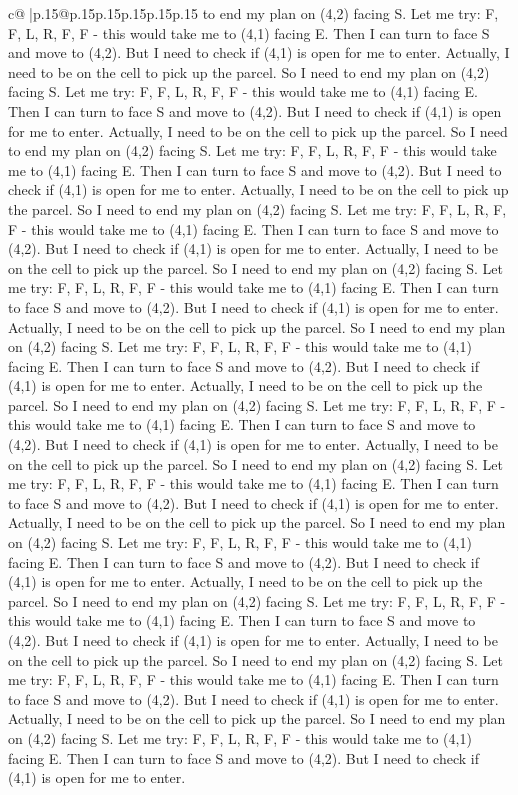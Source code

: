 \documentclass{article}
\begin{document}
{\begin{supertabular}{c@{$\;$}|p{.15\linewidth}@{}p{.15\linewidth}p{.15\linewidth}p{.15\linewidth}p{.15\linewidth}p{.15\linewidth}}
{{{to end my plan on (4,2) facing S. Let me try: F, F, L, R, F, F {-} this would take me to (4,1) facing E. Then I can turn to face S and move to (4,2). But I need to check if (4,1) is open for me to enter. Actually, I need to be on the cell to pick up the parcel. So I need to end my plan on (4,2) facing S. Let me try: F, F, L, R, F, F {-} this would take me to (4,1) facing E. Then I can turn to face S and move to (4,2). But I need to check if (4,1) is open for me to enter. Actually, I need to be on the cell to pick up the parcel. So I need to end my plan on (4,2) facing S. Let me try: F, F, L, R, F, F {-} this would take me to (4,1) facing E. Then I can turn to face S and move to (4,2). But I need to check if (4,1) is open for me to enter. Actually, I need to be on the cell to pick up the parcel. So I need to end my plan on (4,2) facing S. Let me try: F, F, L, R, F, F {-} this would take me to (4,1) facing E. Then I can turn to face S and move to (4,2). But I need to check if (4,1) is open for me to enter. Actually, I need to be on the cell to pick up the parcel. So I need to end my plan on (4,2) facing S. Let me try: F, F, L, R, F, F {-} this would take me to (4,1) facing E. Then I can turn to face S and move to (4,2). But I need to check if (4,1) is open for me to enter. Actually, I need to be on the cell to pick up the parcel. So I need to end my plan on (4,2) facing S. Let me try: F, F, L, R, F, F {-} this would take me to (4,1) facing E. Then I can turn to face S and move to (4,2). But I need to check if (4,1) is open for me to enter. Actually, I need to be on the cell to pick up the parcel. So I need to end my plan on (4,2) facing S. Let me try: F, F, L, R, F, F {-} this would take me to (4,1) facing E. Then I can turn to face S and move to (4,2). But I need to check if (4,1) is open for me to enter. Actually, I need to be on the cell to pick up the parcel. So I need to end my plan on (4,2) facing S. Let me try: F, F, L, R, F, F {-} this would take me to (4,1) facing E. Then I can turn to face S and move to (4,2). But I need to check if (4,1) is open for me to enter. Actually, I need to be on the cell to pick up the parcel. So I need to end my plan on (4,2) facing S. Let me try: F, F, L, R, F, F {-} this would take me to (4,1) facing E. Then I can turn to face S and move to (4,2). But I need to check if (4,1) is open for me to enter. Actually, I need to be on the cell to pick up the parcel. So I need to end my plan on (4,2) facing S. Let me try: F, F, L, R, F, F {-} this would take me to (4,1) facing E. Then I can turn to face S and move to (4,2). But I need to check if (4,1) is open for me to enter. Actually, I need to be on the cell to pick up the parcel. So I need to end my plan on (4,2) facing S. Let me try: F, F, L, R, F, F {-} this would take me to (4,1) facing E. Then I can turn to face S and move to (4,2). But I need to check if (4,1) is open for me to enter. Actually, I need to be on the cell to pick up the parcel. So I need to end my plan on (4,2) facing S. Let me try: F, F, L, R, F, F {-} this would take me to (4,1) facing E. Then I can turn to face S and move to (4,2). But I need to check if (4,1) is open for me to enter. }}}
\end{supertabular}}
\end{document}
